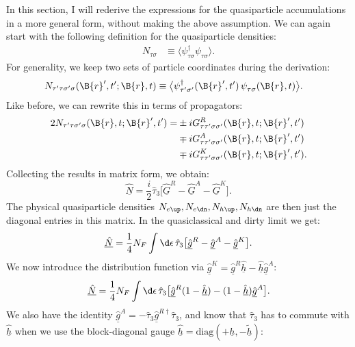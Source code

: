 In this section, I will rederive the expressions for the quasiparticle accumulations in a more general form, without making the above assumption.
We can again start with the following definition for the quasiparticle densities:
\begin{align}
  N_{\tau\sigma} &\equiv \big\langle \psi_{\tau\sigma}^\dagger \psi_{\tau\sigma}^{\phantom{\dagger}} \big\rangle.
\end{align}
For generality, we keep two sets of particle coordinates during the derivation:
\begin{align}
  N_{\tau'\tau\sigma'\sigma}(\B{r}',t'; \B{r},t) &\equiv \big\langle \psi_{\tau'\sigma'}^\dagger(\B{r}',t')\, \psi_{\tau\sigma}^{\phantom{\dagger}}(\B{r},t) \big\rangle.
\end{align}
Like before, we can rewrite this in terms of propagators:
\begin{equation}
\begin{aligned}
  2N_{\tau'\tau\sigma'\sigma}(\B{r}, t; \B{r}', t')
   =& \pm i G^R_{\tau\tau'\sigma\sigma'}(\B{r}, t; \B{r}', t') \\
    & \mp i G^A_{\tau\tau'\sigma\sigma'}(\B{r}, t; \B{r}', t') \\
    & \mp i G^K_{\tau\tau'\sigma\sigma'}(\B{r}, t; \B{r}', t') .
\end{aligned}
\end{equation}
Collecting the results in matrix form, we obtain:
\begin{equation}
  \underline{\hat{N}} = \frac{i}{2} \hat{\tau}_3 \big[\underline{\hat{G}}^R - \underline{\hat{G}}^A - \underline{\hat{G}}^K \big].
\end{equation}
The physical quasiparticle densities $N_{e\up}, N_{e\dn}, N_{h\up}, N_{h\dn}$ are then just the diagonal entries in this matrix.
In the quasiclassical and dirty limit we get:
\begin{equation}
  \underline{\hat{N}} = \frac{1}{4} N_F \int\d\epsilon \, \hat{\tau}_3 \big[\underline{\hat{g}}^R - \underline{\hat{g}}^A - \underline{\hat{g}}^K \big].
\end{equation}
We now introduce the distribution function via $\underline{\hat{g}}^K = \underline{\hat{g}}^R \underline{\hat{h}} - \underline{\hat{h}} \underline{\hat{g}}^A$:
\begin{equation}
  \underline{\hat{N}} = \frac{1}{4} N_F \int\d\epsilon \, \hat{\tau}_3 \big[\underline{\hat{g}}^R (1-\underline{\hat{h}}) - (1-\underline{\hat{h}}) \underline{\hat{g}}^A \big].
\end{equation}
We also have the identity $\underline{\hat{g}}^A = -\hat{\tau}_3 \underline{\hat{g}}^{R\dagger} \hat{\tau}_3$, and know that $\hat{\tau}_3$ has to commute with $\underline{\hat{h}}$ when we use the block-diagonal gauge $\underline{\hat{h}} = \text{diag}(+\underline{h},-\underline{\tilde{h}})$:
